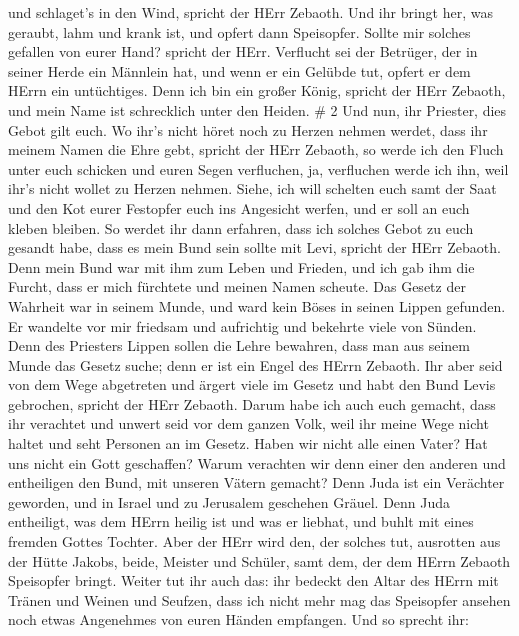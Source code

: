 und schlaget's in den Wind, spricht der HErr Zebaoth. Und ihr bringt
her, was geraubt, lahm und krank ist, und opfert dann Speisopfer. Sollte
mir solches gefallen von eurer Hand? spricht der HErr. 
Verflucht sei der Betrüger, der in seiner Herde ein Männlein hat, und
wenn er ein Gelübde tut, opfert er dem HErrn ein untüchtiges. Denn ich
bin ein großer König, spricht der HErr Zebaoth, und mein Name ist
schrecklich unter den Heiden. \# 2  Und nun, ihr Priester,
dies Gebot gilt euch.  Wo ihr's nicht höret noch zu Herzen
nehmen werdet, dass ihr meinem Namen die Ehre gebt, spricht der HErr
Zebaoth, so werde ich den Fluch unter euch schicken und euren Segen
verfluchen, ja, verfluchen werde ich ihn, weil ihr's nicht wollet zu
Herzen nehmen.  Siehe, ich will schelten euch samt der Saat
und den Kot eurer Festopfer euch ins Angesicht werfen, und er soll an
euch kleben bleiben.  So werdet ihr dann erfahren, dass ich
solches Gebot zu euch gesandt habe, dass es mein Bund sein sollte mit
Levi, spricht der HErr Zebaoth.  Denn mein Bund war mit ihm
zum Leben und Frieden, und ich gab ihm die Furcht, dass er mich
fürchtete und meinen Namen scheute.  Das Gesetz der Wahrheit
war in seinem Munde, und ward kein Böses in seinen Lippen gefunden. Er
wandelte vor mir friedsam und aufrichtig und bekehrte viele von Sünden.
 Denn des Priesters Lippen sollen die Lehre bewahren, dass
man aus seinem Munde das Gesetz suche; denn er ist ein Engel des HErrn
Zebaoth.  Ihr aber seid von dem Wege abgetreten und ärgert
viele im Gesetz und habt den Bund Levis gebrochen, spricht der HErr
Zebaoth.  Darum habe ich auch euch gemacht, dass ihr
verachtet und unwert seid vor dem ganzen Volk, weil ihr meine Wege nicht
haltet und seht Personen an im Gesetz.  Haben wir nicht
alle einen Vater? Hat uns nicht ein Gott geschaffen? Warum verachten wir
denn einer den anderen und entheiligen den Bund, mit unseren Vätern
gemacht?  Denn Juda ist ein Verächter geworden, und in
Israel und zu Jerusalem geschehen Gräuel. Denn Juda entheiligt, was dem
HErrn heilig ist und was er liebhat, und buhlt mit eines fremden Gottes
Tochter.  Aber der HErr wird den, der solches tut,
ausrotten aus der Hütte Jakobs, beide, Meister und Schüler, samt dem,
der dem HErrn Zebaoth Speisopfer bringt.  Weiter tut ihr
auch das: ihr bedeckt den Altar des HErrn mit Tränen und Weinen und
Seufzen, dass ich nicht mehr mag das Speisopfer ansehen noch etwas
Angenehmes von euren Händen empfangen.  Und so sprecht ihr:
